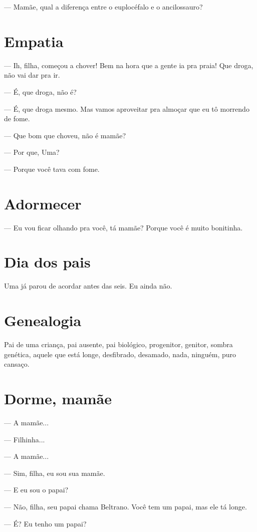 — Mamãe, qual a diferença entre o euplocéfalo e o ancilossauro?

\chapter{Empatia}

— Ih, filha, começou a chover! Bem na hora que a gente ia pra praia! Que
droga, não vai dar pra ir.

— É, que droga, não é?

— É, que droga mesmo. Mas vamos aproveitar pra almoçar que eu tô
morrendo de fome.

— Que bom que choveu, não é mamãe?

— Por que, Uma?

— Porque você tava com fome.

\chapter{Adormecer}

— Eu vou ficar olhando pra você, tá mamãe? Porque você é muito
bonitinha.

\chapter{Dia dos pais}

Uma já parou de acordar antes das seis. Eu ainda não.

\chapter{Genealogia}

Pai de uma criança, pai ausente, pai biológico, progenitor, genitor,
sombra genética, aquele que está longe, desfibrado, desamado, nada,
ninguém, puro cansaço.

\chapter{Dorme, mamãe}

— A mamãe...

— Filhinha...

— A mamãe...

— Sim, filha, eu sou sua mamãe.

— E eu sou o papai?

— Não, filha, seu papai chama Beltrano. Você tem um papai, mas ele tá
longe.

— É? Eu tenho um papai?

